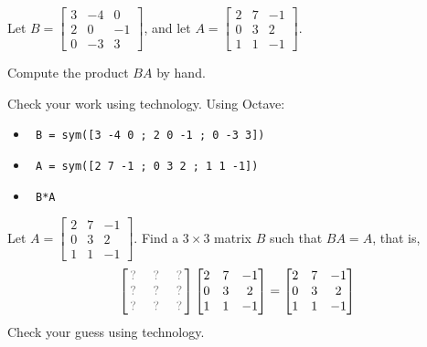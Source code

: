 \begin{activity}{15}
Let \(B=\begin{bmatrix} 3 & -4 & 0 \\ 2 & 0 & -1 \\ 0 & -3 & 3 \end{bmatrix}\), 
and let \(A=\begin{bmatrix} 2 & 7 & -1 \\ 0 & 3 & 2 \\ 1 & 1 & -1 \end{bmatrix}\).  
\begin{subactivity}
  Compute the product \(BA\) by hand.
\end{subactivity}
\begin{subactivity}
  Check your work using technology. Using Octave:
  \begin{itemize}
    \item \texttt{ B = sym([3 -4 0 ; 2 0 -1 ; 0 -3 3]) }
    \item \texttt{ A = sym([2 7 -1 ; 0 3 2  ; 1 1 -1]) }
    \item \texttt{ B*A }
  \end{itemize}
\end{subactivity}
\end{activity}

\begin{activity}{5}
Let \(A=\begin{bmatrix} 2 & 7 & -1 \\ 0 & 3 & 2 \\ 1 & 1 & -1 \end{bmatrix}\).  
Find a \(3 \times 3\) matrix \(B\) such that \(BA=A\), that is,
\[
  \begin{bmatrix} \unknown & \unknown & \unknown \\ 
  \unknown & \unknown & \unknown 
  \\ \unknown & \unknown & \unknown \end{bmatrix}
  \begin{bmatrix} 2 & 7 & -1 \\ 0 & 3 & 2 \\ 1 & 1 & -1 \end{bmatrix}
=
  \begin{bmatrix} 2 & 7 & -1 \\ 0 & 3 & 2 \\ 1 & 1 & -1 \end{bmatrix}
\]
Check your guess using technology.
\end{activity}

